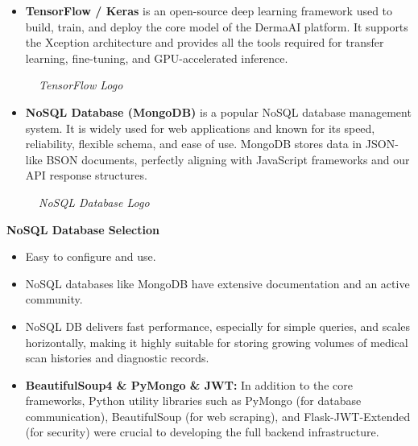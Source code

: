 \begin{itemize}
	\item \textbf{TensorFlow / Keras} is an open-source deep learning framework used to build, train, and deploy the core model of the DermaAI platform. It supports the Xception architecture and provides all the tools required for transfer learning, fine-tuning, and GPU-accelerated inference.
\end{itemize}

\begin{figure}[H]
	\centering
	\caption{\textit{TensorFlow Logo}}
\end{figure}

\begin{itemize}
	\item \textbf{NoSQL Database (MongoDB)} is a popular NoSQL database management system. It is widely used for web applications and known for its speed, reliability, flexible schema, and ease of use. MongoDB stores data in JSON-like BSON documents, perfectly aligning with JavaScript frameworks and our API response structures.
\end{itemize}

\begin{figure}[H]
	\centering
	\caption{\textit{NoSQL Database Logo}}
\end{figure}

\textbf{\textbf{NoSQL Database Selection}}
\begin{itemize}
	\item[\textbf{o}] Easy to configure and use.
	\item[\textbf{o}] NoSQL databases like MongoDB have extensive documentation and an active community.
	\item[\textbf{o}] NoSQL DB delivers fast performance, especially for simple queries, and scales horizontally, making it highly suitable for storing growing volumes of medical scan histories and diagnostic records.
\end{itemize}

\begin{itemize}
	\item \textbf{BeautifulSoup4 \& PyMongo \& JWT:} In addition to the core frameworks, Python utility libraries such as PyMongo (for database communication), BeautifulSoup (for web scraping), and Flask-JWT-Extended (for security) were crucial to developing the full backend infrastructure.
\end{itemize}

